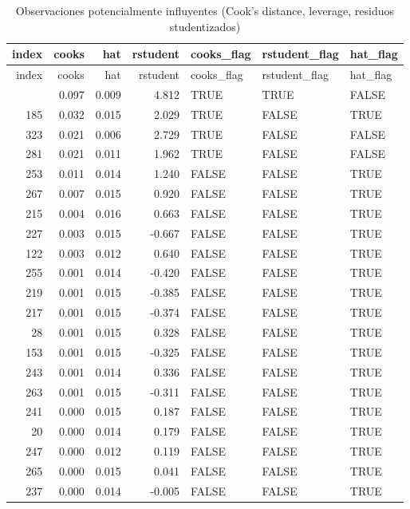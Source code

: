 \documentclass[
  spanish,
  11pt,
  a4paper,
  DIV=11,
  numbers=noendperiod]{scrartcl}
\begin{document}
\begin{longtable}[]{@{}rrrrlll@{}}
\caption{Observaciones potencialmente influyentes (Cook's distance,
leverage, residuos studentizados)}\tabularnewline
\toprule\noalign{}
index & cooks & hat & rstudent & cooks\_flag & rstudent\_flag &
hat\_flag \\
\midrule\noalign{}
\endfirsthead
\toprule\noalign{}
index & cooks & hat & rstudent & cooks\_flag & rstudent\_flag &
hat\_flag \\
\midrule\noalign{}
\endhead
\bottomrule\noalign{}
\endlastfoot
292 & 0.097 & 0.009 & 4.812 & TRUE & TRUE & FALSE \\
185 & 0.032 & 0.015 & 2.029 & TRUE & FALSE & TRUE \\
323 & 0.021 & 0.006 & 2.729 & TRUE & FALSE & FALSE \\
281 & 0.021 & 0.011 & 1.962 & TRUE & FALSE & FALSE \\
253 & 0.011 & 0.014 & 1.240 & FALSE & FALSE & TRUE \\
267 & 0.007 & 0.015 & 0.920 & FALSE & FALSE & TRUE \\
215 & 0.004 & 0.016 & 0.663 & FALSE & FALSE & TRUE \\
227 & 0.003 & 0.015 & -0.667 & FALSE & FALSE & TRUE \\
122 & 0.003 & 0.012 & 0.640 & FALSE & FALSE & TRUE \\
255 & 0.001 & 0.014 & -0.420 & FALSE & FALSE & TRUE \\
219 & 0.001 & 0.015 & -0.385 & FALSE & FALSE & TRUE \\
217 & 0.001 & 0.015 & -0.374 & FALSE & FALSE & TRUE \\
28 & 0.001 & 0.015 & 0.328 & FALSE & FALSE & TRUE \\
153 & 0.001 & 0.015 & -0.325 & FALSE & FALSE & TRUE \\
243 & 0.001 & 0.014 & 0.336 & FALSE & FALSE & TRUE \\
263 & 0.001 & 0.015 & -0.311 & FALSE & FALSE & TRUE \\
241 & 0.000 & 0.015 & 0.187 & FALSE & FALSE & TRUE \\
20 & 0.000 & 0.014 & 0.179 & FALSE & FALSE & TRUE \\
247 & 0.000 & 0.012 & 0.119 & FALSE & FALSE & TRUE \\
265 & 0.000 & 0.015 & 0.041 & FALSE & FALSE & TRUE \\
237 & 0.000 & 0.014 & -0.005 & FALSE & FALSE & TRUE \\
\end{longtable}
\end{document}
